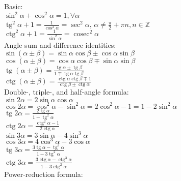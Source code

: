 \documentclass{letter}
\DeclareMathOperator{\tg}{tg}
\DeclareMathOperator{\ctg}{ctg}
\DeclareMathOperator{\cosec}{cosec}
\begin{document}
Basic: \\

$ \sin^2 \alpha + \cos^2 \alpha = 1 ,  \forall \alpha $ \\
$ \tg^2 \alpha + 1 = \frac{1}{\cos^2 \alpha} = \sec^2 \alpha $, $\alpha \neq \frac{\pi}{2} + \pi n, n \in \mathbb Z $ \\
$\ctg^2 \alpha + 1 = \frac{1}{\sin^2 \alpha} = \cosec^2 \alpha$ \\

Angle sum and difference identities: \\

$\sin \left( \alpha \pm \beta \right) = \sin \alpha \cos \beta \pm \cos \alpha \sin \beta$ \\
$\cos \left( \alpha \pm \beta \right) = \cos \alpha \cos \beta \mp \sin \alpha \sin \beta$ \\
$\tg \left( \alpha \pm \beta \right) = \frac{ \tg \alpha \pm \tg \beta}{1 \mp \tg \alpha \tg\beta}$ \\
$\ctg \left( \alpha \pm \beta \right) = \frac{ \ctg \alpha \ctg \beta \mp 1}{\ctg \beta \pm \ctg\alpha}$ \\

Double-, triple-, and half-angle formula: \\

$ \sin 2 \alpha = 2 {\sin \alpha}{\cos \alpha} $ \\
$ \cos 2 \alpha = {\cos^2 \alpha} - {\sin^2 \alpha} = 2 {\cos^2 \alpha} - 1 = 1 - 2 {\sin^2 \alpha} $ \\
$ \tg 2 \alpha = \frac{2 \tg \alpha}{1 - \tg^2 \alpha} $ \\
$ \ctg 2 \alpha = \frac{\ctg^2 \alpha - 1}{2 \ctg \alpha} $ \\

$\sin 3\alpha = 3 \sin \alpha - 4 \sin^3\alpha \,$ \\
$\cos 3\alpha = 4 \cos^3\alpha - 3 \cos \alpha \,$ \\
$\tg 3\alpha = \frac{3 \tg\alpha - \tg^3\alpha}{1 - 3 \tg^2\alpha}$ \\
$\ctg 3\alpha = \frac{3 \ctg\alpha - \ctg^3\alpha}{1 - 3 \ctg^2\alpha}$ \\

Power-reduction formula: \\
\end{document}
